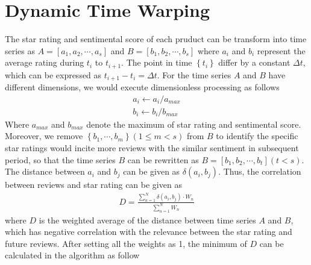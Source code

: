 \documentclass[12pt]{article}%
\begin{document}
\section{Dynamic Time Warping}
The star rating and sentimental score of each pruduct can be transform into time series as $A=[a_{1},a_{2},\cdots,a_{s}]$ and $B=[b_{1},b_{2},\cdots,b_{s}]$ where  $a_{i}$ and $b_{i}$  represent the average rating during $t_{i}$ to $t_{i+1}$. The point in time $\left \{ t_{i}  \right \}$ differ by a constant $\Delta t$, which can be expressed as $t_{i+1}-t_{i}=\Delta t$. 
For the time series $A$ and $B$ have different dimensions, we would execute dimensionless processing as follows
\begin{gather*}
a_{i}\leftarrow a_{i}/a_{max}\\
b_{i}\leftarrow b_{i}/b_{max}
\end{gather*}
Where $a_{max}$ and $b_{max}$ denote the maximum of star rating and sentimental score. Moreover, we remove $\left \{b_{1},\cdots,b_{m}\right \}(1\leqslant m<s)$ from $B$ to identify the specific star ratings would incite more reviews with the similar sentiment in subsequent period, so that the time series $B$ can be rewritten as $B=[b_{1},b_{2},\cdots,b_{t}] (t<s)$. The distance between $a_{i}$ and $b_{j}$ can be given as $\delta(a_{i},b_{j})$. Thus, the correlation between reviews and star rating can be given as
\begin{gather}
 D=\frac{\sum_{n=1}^{N}\delta(a_{i},b_{j})\cdot W_{n}}{\sum_{n=1}^{N}W_{n}}
\end{gather}
where $D$ is the weighted average of the distance between time series $A$ and $B$, which has negative correlation with the relevance between the star rating and future reviews. After setting all the weights as 1, the minimum of $D$ can be calculated in the algorithm as follow%
\end{document}

